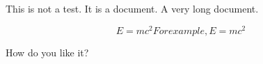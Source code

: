 \documentclass[10pt]{article}
\begin{document}
This is not a test. It is a document. A very long document.

$$
E = mc^2
For example, E = mc^2
$$

How do you like it?
\end{document}
